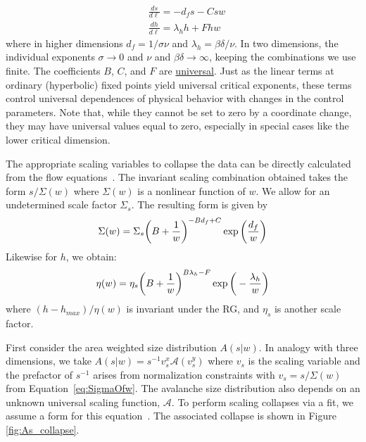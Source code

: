 \documentclass[reprint,amsmath,amssymb,aps,floatfix]{revtex4-1}
\begin{document}
%
\begin{equation}
	\begin{split}
		&\frac{ds}{d\ell}= -d_f s-C s w\\
		&\frac{dh}{d\ell}= \lambda_h h+F h w
	\end{split}
\end{equation}
%
\noindent where in higher dimensions $d_f = 1/\sigma \nu$ and $\lambda_h = \beta \delta / \nu$. In two dimensions, the individual exponents $\sigma \to 0$ and
$\nu$ and $\beta \delta \to \infty$, keeping the combinations we use finite.  The coefficients $B$, $C$, and $F$ are \underline{universal}. Just as the linear terms at ordinary (hyperbolic) fixed points yield universal critical exponents, these terms control universal dependences of physical behavior with changes in the control parameters. Note that, while they cannot be set to zero by a coordinate change, they may have universal values equal to zero, especially in special cases like the lower critical dimension.\par
%
The appropriate scaling variables to collapse the data can be directly calculated from the flow equations~\cite[Section~\ref{supp-app:truncated}]{RFIM2Dsupp}. The invariant scaling combination obtained takes the form $s/\Sigma(w)$ where $\Sigma(w)$ is a nonlinear function of $w$. We allow for an undetermined scale factor $\Sigma_s$. The resulting form is given by 
%
\begin{equation}
 	\label{eq:SigmaOfw}
	\Sigma(w) = \Sigma_s \bigg{(}B+\frac{1}{w}\bigg{)}^{-B d_f+C}\exp \bigg{(}\frac{d_f}{w}\bigg{)}
\end{equation}
%
\noindent Likewise for $h$, we obtain:
%
\begin{equation}
 	\label{eq:etaOfw}
	\eta(w) = \eta_s\bigg{(}B+\frac{1}{w}\bigg{)}^{B \lambda_h-F}\exp \bigg{(}-\frac{\lambda_h}{w}\bigg{)}
\end{equation}
%
\noindent where $(h-h_{max})/\eta(w)$ is invariant under the RG, and $\eta_s$ is another scale factor. \par
%
First consider the area weighted size distribution $A(s|w)$. In analogy with three dimensions, we take $A(s|w) = s^{-1}v_s^x \mathcal{A}(v_s^y)$ where $v_s$ is the scaling variable and the prefactor of $s^{-1}$ arises from normalization constraints with $v_s=s/\Sigma(w)$ from Equation~\ref{eq:SigmaOfw}. The avalanche size distribution also depends on an unknown universal scaling function, $\mathcal{A}$. To perform scaling collapses via a fit, we assume a form for this equation~\cite[Section~\ref{supp-app:universal}]{RFIM2Dsupp}. The associated collapse is shown in Figure \ref{fig:As_collapse}. \par
\end{document}

